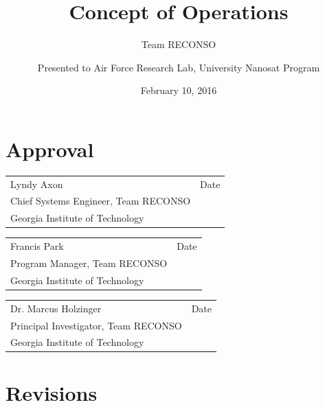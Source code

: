 \documentclass{article}
\title{\vspace{2in} \textbf{Concept of Operations}}
\author{Team RECONSO}
\date{February 10, 2016}
\author{Presented to Air Force Research Lab, University Nanosat Program}
\begin{document}
\maketitle\thispagestyle{fancy}

\newpage

\section*{\center Approval}
\vspace{1in}
\begin{center}
	\begin{tabular}{p{3in}p{1in}}
		& \\ \hline
		Lyndy Axon & \hfill Date \\
		Chief Systems Engineer, Team RECONSO \\
		Georgia Institute of Technology \\
	\end{tabular}
\end{center}
\begin{center}
\begin{tabular}{p{3in}p{1in}}
    & \\ \hline
    Francis Park & \hfill Date \\
    Program Manager, Team RECONSO & \\
    Georgia Institute of Technology & \\
\end{tabular}
\end{center}
\vspace{0.5in}

\vspace{0.5in}
\begin{center}
\begin{tabular}{p{3in}p{1in}}
    & \\ \hline
    Dr. Marcus Holzinger & \hfill Date \\
    Principal Investigator, Team RECONSO \\
    Georgia Institute of Technology \\
\end{tabular}
\end{center}

\newpage


\section*{\centering Revisions}
\end{document}
